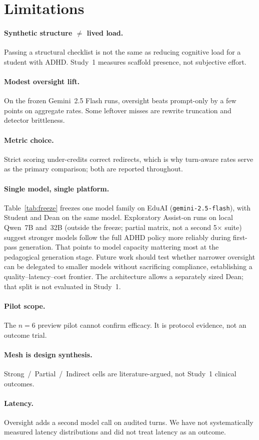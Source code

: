 \section{Limitations}
\label{sec:limitations}

\paragraph{Synthetic structure $\neq$ lived load.}
Passing a structural checklist is not the same as reducing cognitive load for
a student with ADHD. Study~1 measures scaffold presence, not subjective
effort.

\paragraph{Modest oversight lift.}
On the frozen Gemini~2.5 Flash runs, oversight beats prompt-only by a few
points on aggregate rates. Some leftover misses are rewrite truncation and
detector brittleness.

\paragraph{Metric choice.}
Strict scoring under-credits correct redirects, which is why turn-aware rates
serve as the primary comparison; both are reported throughout.

\paragraph{Single model, single platform.}
Table~\ref{tab:freeze} freezes one model family on EduAI
(\texttt{gemini-2.5-flash}), with Student and Dean on the same model.
Exploratory Assist-on runs on local Qwen~7B and~32B (outside the freeze;
partial matrix, not a second 5$\times$ suite) suggest stronger models follow
the full ADHD policy more reliably during first-pass generation. That points
to model capacity mattering most at the pedagogical generation stage. Future
work should test whether narrower oversight can be delegated to smaller models
without sacrificing compliance, establishing a quality--latency--cost
frontier. The architecture allows a separately sized Dean; that split is not
evaluated in Study~1.

\paragraph{Pilot scope.}
The $n{=}6$ preview pilot cannot confirm efficacy. It is protocol evidence,
not an outcome trial.

\paragraph{Mesh is design synthesis.}
Strong~/~Partial~/~Indirect cells are literature-argued, not Study~1 clinical
outcomes.

\paragraph{Latency.}
Oversight adds a second model call on audited turns. We have not
systematically measured latency distributions and did not treat latency as an
outcome.
